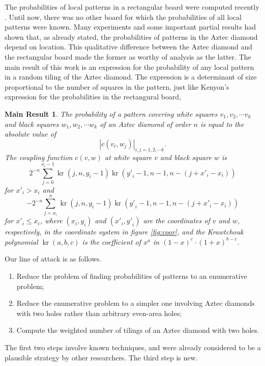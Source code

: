 \documentclass[10pt,reqno]{amsart}
\theoremstyle{plain}
\newtheorem{Mres}{Main Result}
\theoremstyle{definition}
\theoremstyle{remark}
\def\determinant#1{\left|#1\right|}
\DeclareMathOperator{\kr }{kr}
\begin{document}
The probabilities of local patterns in a rectangular board were computed
recently \cite{Ken}. Until now, there was no other board for which
the probabilities of all local patterns were known. Many experiments 
and some important partial results \cite{CEP} had shown that, as already
stated, the probabilities of patterns in the Aztec diamond depend on location.
This qualitative difference between the Aztec diamond and the rectangular
board made the former as worthy of analysis as the latter. 
The main result of this work
is an expression for the 
probability of any local pattern in a random tiling of the Aztec diamond.
The expression is a determinant of size proportional to the number of
squares in the pattern, just like Kenyon's expression \cite{Ken} for
the probabilities in the rectangural board,
 
\begin{Mres}
The probability of a pattern covering white squares $v_1,v_2,\dotsb v_k$
and black squares $w_1,w_2,\dotsb w_k$ of
 an Aztec diamond of order $n$ is equal
to the absolute value of
\[\determinant{c(v_i,w_j)}_{i,j=1,2,\dotsb k}.\]
The {\em coupling function} $c(v,w)$ at white square $v$ and black
square $w$ is 
\[2^{-n} \sum_{j=0}^{x_i-1} \kr(j,n,y_i-1) 
			    \kr({y\prime }_i - 1,n-1,n-(j+{x\prime }_i-x_i))
\]
for ${x\prime }_i > x_i$ and
\[-2^{-n} \sum_{j=x_i}^n \kr(j,n,y_i-1) 
			 \kr({y\prime }_i-1,n-1,n-(j+{x\prime }_i-x_i))
\]
for ${x\prime }_i \leq x_i$, where $(x_i,y_i)$ and $({x\prime}_i,{y\prime}_i)$
are the coordinates of $v$ and $w$, respectively, in the coordinate
system in figure \ref{fig:coor}, and the {\em Krawtchouk polynomial}
$\kr(a,b,c)$ is the coefficient of $x^a$ in $(1-x)^c\cdot (1+x)^{b-c}$.
\end{Mres}

Our line of attack is as follows.
\begin{enumerate}
\item Reduce the problem of finding probabilities of patterns to an 
enumerative problem;
\item Reduce the enumerative problem to a simpler one involving
Aztec diamonds with two holes rather than arbitrary even-area holes;
\item Compute the weighted number of tilings of an Aztec diamond with two holes.
\end{enumerate}

The first two steps involve known techniques, and were already considered
to be a plausible strategy by other researchers. The third step is new.
\end{document}

